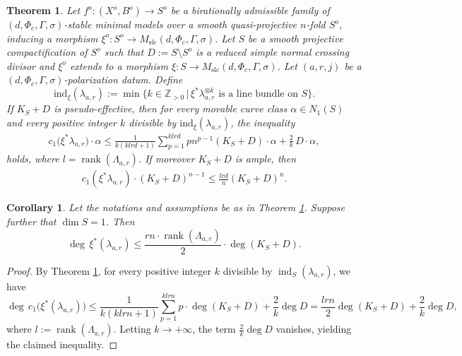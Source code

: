 \documentclass[10pt,a4paper]{amsart}
\newtheorem{thm}{Theorem}
\newtheorem{cor}{Corollary}
\begin{document}
	\begin{thm}\label{thm_Arakelov_family}
		Let $f^o \colon (X^o, B^o) \to S^o$ be a birationally admissible family of $(d, \Phi_c, \Gamma, \sigma)$-stable minimal models over a smooth quasi-projective $n$-fold $S^o$, inducing a morphism $\xi^o \colon S^o \to M_{\mathrm{slc}}(d, \Phi_c, \Gamma, \sigma)$. Let $S$ be a smooth projective compactification of $S^o$ such that $D := S \setminus S^o$ is a reduced simple normal crossing divisor and $\xi^o$ extends to a morphism $\xi \colon S \to M_{\mathrm{slc}}(d, \Phi_c, \Gamma, \sigma)$. Let $(a,r,j)$ be a $(d, \Phi_c, \Gamma, \sigma)$-polarization datum. Define  
		\[
		\mathrm{ind}_\xi(\lambda_{a,r}) := \min\big\{k \in \mathbb{Z}_{>0} \,\big|\, \xi^*\lambda_{a,r}^{\otimes k} \text{ is a line bundle on } S \big\}.
		\]  
		If $K_S + D$ is pseudo-effective, then for every movable curve class $\alpha \in N_1(S)$ and every positive integer $k$ divisible by $\mathrm{ind}_\xi(\lambda_{a,r})$, the inequality  
		\begin{align}\label{align_Ara_1}
			c_1\big(\xi^*\lambda_{a,r}\big) \cdot \alpha 
			\leq \frac{1}{k(k l r d + 1)} \sum_{p=1}^{k l r d} p n^{p-1} (K_S + D) \cdot \alpha + \frac{2}{k}\, D \cdot \alpha,
		\end{align}  
		holds, where $l = \operatorname{rank}(\Lambda_{a,r})$.
		If moreover $K_S+D$ is ample, then  
		\begin{align}\label{align_Ara_2}
			c_1(\xi^*\lambda_{a,r})\cdot(K_S+D)^{n-1} \leq \frac{lrd}{n}(K_S+D)^{n}.
		\end{align}
	\end{thm}

\begin{cor}\label{cor_Arakelov_dim1}
	Let the notations and assumptions be as in Theorem \ref{thm_Arakelov_family}. Suppose further that $\dim S = 1$. Then  
	\begin{equation*}
		\deg\, \xi^\ast(\lambda_{a,r}) \leq \frac{r n \cdot \operatorname{rank}(\Lambda_{a,r})}{2} \cdot \deg(K_S + D).
	\end{equation*}
\end{cor}

\begin{proof}
	By Theorem \ref{thm_Arakelov_family}, for every positive integer $k$ divisible by $\operatorname{ind}_S(\lambda_{a,r})$, we have  
	\begin{equation*}
		\deg\, c_1\big(\xi^\ast(\lambda_{a,r})\big) 
		\leq \frac{1}{k(k l r n + 1)} \sum_{p=1}^{k l r n} p \cdot \deg(K_S + D) + \frac{2}{k} \deg D
		= \frac{l r n}{2} \deg(K_S + D) + \frac{2}{k} \deg D,
	\end{equation*}
	where $l := \operatorname{rank}(\Lambda_{a,r})$. Letting $k \to +\infty$, the term $\frac{2}{k}\deg D$ vanishes, yielding the claimed inequality.
\end{proof}
\end{document}
